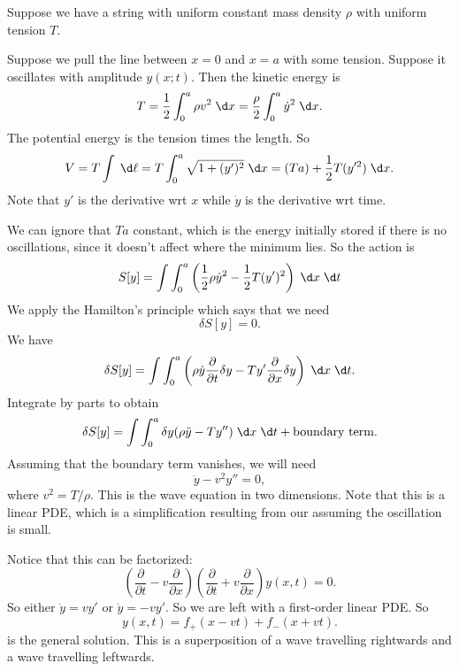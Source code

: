 \documentclass[a4paper]{article}
\begin{document}
\begin{eg}
  Suppose we have a string with uniform constant mass density $\rho$ with uniform tension $T$.
  \begin{center}
  \end{center}
  Suppose we pull the line between $x = 0$ and $x = a$ with some tension. Suppose it oscillates with amplitude $y(x; t)$.  Then the kinetic energy is
  \[
    T = \frac{1}{2}\int_0^a \rho v^2\;\d x = \frac{\rho}{2}\int_0^a \dot{y}^2 \;\d x.
  \]
  The potential energy is the tension times the length. So
  \[
    V = T\int \;\d \ell = T\int_0^a\sqrt{1 + (y')^2}\;\d x = (Ta) + \frac{1}{2}T(y'^2)\;\d x.
  \]
  Note that $y'$ is the derivative wrt $x$ while $\dot{y}$ is the derivative wrt time.

  We can ignore that $Ta$ constant, which is the energy initially stored if there is no oscillations, since it doesn't affect where the minimum lies. So the action is
  \[
    S[y] = \int \int_0^a \left(\frac{1}{2}\rho \dot{y}^2 - \frac{1}{2}T(y')^2\right)\;\d x\;\d t
  \]
  We apply the Hamilton's principle which says that we need
  \[
    \delta S[y] = 0.
  \]
  We have
  \[
    \delta S[y] = \int \int_0^a \left(\rho \dot{y} \frac{\partial}{\partial t}\delta y - Ty' \frac{\partial}{\partial x}\delta y\right)\;\d x\;\d t.
  \]
  Integrate by parts to obtain
  \[
    \delta S[y] = \int \int_0^a \delta y(\rho \ddot{y} - Ty'')\;\d x\;\d t + \text{boundary term}.
  \]
  Assuming that the boundary term vanishes, we will need
  \[
    \ddot{y} - v^2 y'' = 0,
  \]
  where $v^2 = T/\rho$. This is the wave equation in two dimensions. Note that this is a linear PDE, which is a simplification resulting from our assuming the oscillation is small.

  Notice that this can be factorized:
  \[
    \left(\frac{\partial}{\partial t} - v\frac{\partial}{\partial x}\right)\left(\frac{\partial}{\partial t} + v\frac{\partial}{\partial x}\right)y(x, t) = 0.
  \]
  So either $\dot y = vy'$ or $\dot y = -vy'$. So we are left with a first-order linear PDE. So
  \[
    y(x, t) = f_+(x - vt) + f_-(x + vt).
  \]
  is the general solution. This is a superposition of a wave travelling rightwards and a wave travelling leftwards.
\end{eg}
\end{document}
